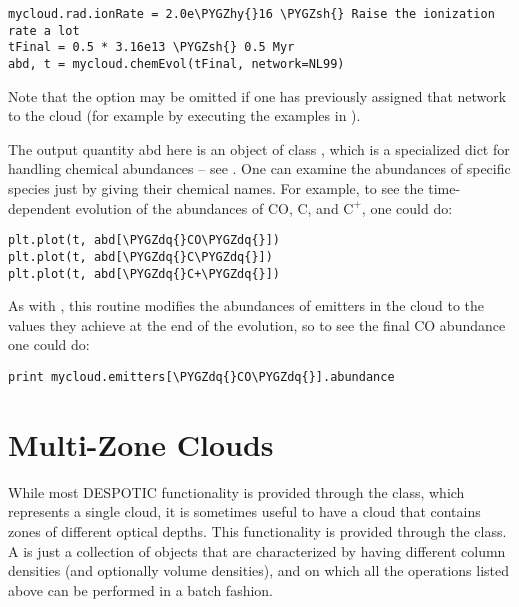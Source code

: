 \documentclass[letterpaper,10pt,english]{sphinxmanual}
\def\PYGZsh{\char`\#}
\def\PYGZhy{\char`\-}
\def\PYGZdq{\char`\"}
\begin{document}
\begin{Verbatim}[commandchars=\\\{\}]
mycloud.rad.ionRate = 2.0e\PYGZhy{}16 \PYGZsh{} Raise the ionization rate a lot
tFinal = 0.5 * 3.16e13 \PYGZsh{} 0.5 Myr
abd, t = mycloud.chemEvol(tFinal, network=NL99)
\end{Verbatim}

Note that the  option may be omitted if one has
previously assigned that network to the cloud (for example by
executing the examples in {\hyperref[functions:ssec-chem-eq]{\emph{}}}).

The output quantity abd here is an object of class ,
which is a specialized dict for handling chemical abundances -- see
{\hyperref[chemistry:sssec-abundancedict]{\emph{}}}. One can examine the abundances of specific
species just by giving their chemical names. For example, to see
the time-dependent evolution of the abundances of CO, C, and
\(\mathrm{C}^+\), one could do:

\begin{Verbatim}[commandchars=\\\{\}]
plt.plot(t, abd[\PYGZdq{}CO\PYGZdq{}])
plt.plot(t, abd[\PYGZdq{}C\PYGZdq{}])
plt.plot(t, abd[\PYGZdq{}C+\PYGZdq{}])
\end{Verbatim}

As with , this routine modifies the abundances of
emitters in the cloud to the values they achieve at the end of the
evolution, so to see the final CO abundance one could do:

\begin{Verbatim}[commandchars=\\\{\}]
print mycloud.emitters[\PYGZdq{}CO\PYGZdq{}].abundance
\end{Verbatim}


\section{Multi-Zone Clouds}
\label{functions:multi-zone-clouds}
While most DESPOTIC functionality is provided through the 
class, which represents a single cloud, it is sometimes useful to have
a cloud that contains zones of different optical depths. This
functionality is provided through the  class. A
 is just a collection of  objects that are
characterized by having different column densities (and optionally
volume densities), and on which all the operations listed above can be
performed in a batch fashion.
\end{document}
